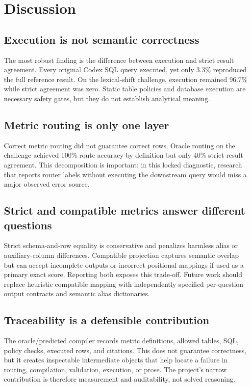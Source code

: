 \documentclass[11pt]{article}
\begin{document}
\section{Discussion}

\subsection{Execution is not semantic correctness}
The most robust finding is the difference between execution and strict result
agreement. Every original Codex SQL query executed, yet only 3.3\% reproduced the
full reference result. On the lexical-shift challenge, execution remained 96.7\%
while strict agreement was zero. Static table policies and database execution are
necessary safety gates, but they do not establish analytical meaning.

\subsection{Metric routing is only one layer}
Correct metric routing did not guarantee correct rows. Oracle routing on the
challenge achieved 100\% route accuracy by definition but only 40\% strict result
agreement. This decomposition is important: in this locked diagnostic, research
that reports router labels without executing the downstream query would miss a
major observed error source.

\subsection{Strict and compatible metrics answer different questions}
Strict schema-and-row equality is conservative and penalizes harmless alias or
auxiliary-column differences. Compatible projection captures semantic overlap but
can accept incomplete outputs or incorrect positional mappings if used as a
primary exact score. Reporting both exposes this trade-off. Future work should
replace heuristic compatible mapping with independently specified per-question
output contracts and semantic alias dictionaries.

\subsection{Traceability is a defensible contribution}
The oracle/predicted compiler records metric definitions, allowed tables, SQL,
policy checks, executed rows, and citations. This does not guarantee correctness,
but it creates inspectable intermediate objects that help locate a failure in
routing, compilation, validation, execution, or prose. The project's narrow
contribution is therefore measurement and auditability, not solved reasoning.
\end{document}
